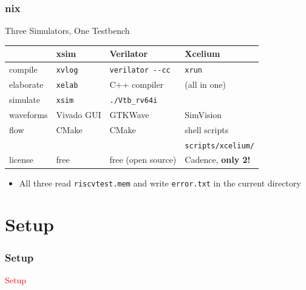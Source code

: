 \documentclass{beamer}
\newcommand{\astitle}{nix}
\newcommand{\assubtitle}{nix}
\newcommand{\cmd}[1]{\texttt{#1}}
\begin{document}
\renewcommand{\assubtitle}{Three Simulators, One Testbench}
\begin{frame}
\frametitle{\astitle}
\begin{block}{\assubtitle}
  \footnotesize
  \begin{tabularx}{\linewidth}{@{}lYYY@{}}
                     & \textbf{xsim} & \textbf{Verilator} & \textbf{Xcelium}\\\hline
    compile          & \cmd{xvlog}   & \cmd{verilator -{}-cc} & \cmd{xrun} \\
    elaborate        & \cmd{xelab}   & C++ compiler       & (all in one)\\
    simulate         & \cmd{xsim}    & \cmd{./Vtb\_rv64i} & \\
    waveforms        & Vivado GUI    & GTKWave            & SimVision\\
    flow             & CMake         & CMake              & shell scripts\\
                     &               &                    & \cmd{scripts/xcelium/}\\
    license          & free          & free (open source) & Cadence, \textbf{only 2!}\\
  \end{tabularx}
  \vspace{4pt}
  \begin{itemize}
    \item All three read \cmd{riscvtest.mem} and write \cmd{error.txt}
      in the current directory
  \end{itemize}
\end{block}
\end{frame}

\section{Setup}
\renewcommand{\astitle}{Setup}
\begin{frame}
\frametitle{\astitle}
\textcolor{red}{Setup}
\end{frame}
\end{document}

